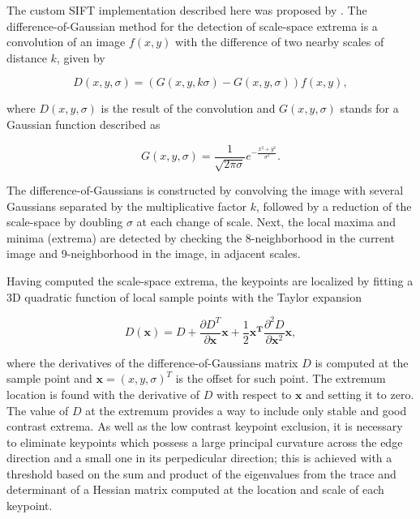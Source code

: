 The custom SIFT implementation described here was proposed by . The difference-of-Gaussian method for the detection of scale-space extrema is a convolution of an image $f(x,y)$ with the difference of two nearby scales of distance $k$, given by

\begin{equation}
\label{eqn:DoG}
D(x,y,\sigma) = \left(G(x,y,k \sigma) - G(x,y,\sigma)\right) f(x,y),
\end{equation}

\noindent where $D(x,y,\sigma)$ is the result of the convolution and $G(x,y,\sigma)$ stands for a Gaussian function described as

\begin{equation}
\label{eqn:gaussian_function}
G(x,y,\sigma) = \frac{1}{\sqrt{2 \pi \sigma}} e^{- \frac{x^{2} + y^{2}}{\sigma^{2}}}.
\end{equation}

The difference-of-Gaussians is constructed by convolving the image with several Gaussians separated by the multiplicative factor $k$, followed by a reduction of the scale-space by doubling $\sigma$ at each change of scale. Next, the local maxima and minima (extrema) are detected by checking the 8-neighborhood in the current image and 9-neighborhood in the image, in adjacent scales.

Having computed the scale-space extrema, the keypoints are localized by fitting a 3D quadratic function of local sample points with the Taylor expansion

\begin{equation}
\label{eqn:taylor_DoG}
D(\mathbf{x}) = D + 
                \frac{\partial D^{T}}{\partial  \mathbf{x}}\mathbf{x} + \frac{1}{2}\mathbf{x^{T}}\frac{\partial^{2} D}{\partial \mathbf{x}^{2}}\mathbf{x},
\end{equation}

\noindent where the derivatives of the difference-of-Gaussians matrix $D$ is computed at the sample point and $\mathbf{x} = (x,y,\sigma)^{T}$ is the offset for such point. The extremum location is found with the derivative of $D$ with respect to $\mathbf{x}$ and setting it to zero. The value of $D$ at the extremum provides a way to include only stable and good contrast extrema. As well as the low contrast keypoint exclusion, it is necessary to eliminate keypoints which possess a large principal curvature across the edge direction and a small one in its perpedicular direction; this is achieved with a threshold based on the sum and product of the eigenvalues from the trace and determinant of a Hessian matrix computed at the location and scale of each keypoint.

